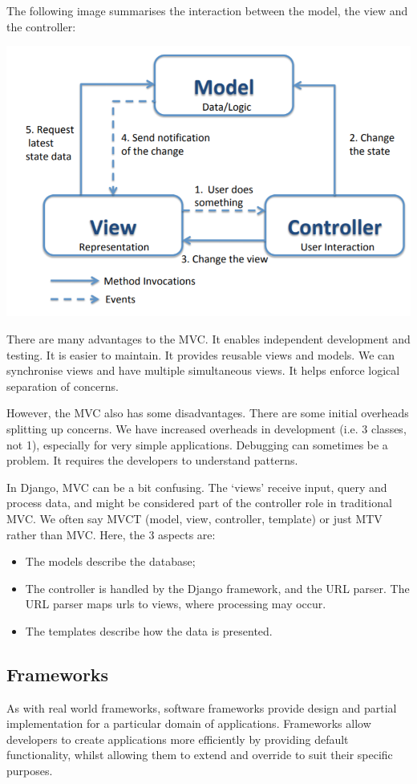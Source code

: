\documentclass[a4paper, openany]{memoir}
\begin{document}
The following image summarises the interaction between the model, the view and the controller:
\begin{center}
    \includegraphics[scale=0.5]{src/L19I1.PNG}
\end{center}
There are many advantages to the MVC. It enables independent development and testing. It is easier to maintain. It provides reusable views and models. We can synchronise views and have multiple simultaneous views. It helps enforce logical separation of concerns. 

However, the MVC also has some disadvantages. There are some initial overheads splitting up concerns. We have increased overheads in development (i.e. 3 classes, not 1), especially for very simple applications. Debugging can sometimes be a problem. It requires the developers to understand patterns.

In Django, MVC can be a bit confusing. The `views' receive input, query and process data, and might be considered part of the controller role in traditional MVC. We often say MVCT (model, view, controller, template) or just MTV rather than MVC. Here, the 3 aspects are:
\begin{itemize}
    \item The models describe the database;
    \item The controller is handled by the Django framework, and the URL parser. The URL parser maps urls to views, where processing may occur.
    \item The templates describe how the data is presented.
\end{itemize}

\subsection{Frameworks}
As with real world frameworks, software frameworks provide design and partial implementation for a particular domain of applications. Frameworks allow developers to create applications more efficiently by providing default functionality, whilst allowing them to extend and override to suit their specific purposes.
\end{document}
